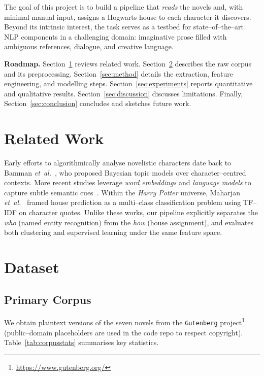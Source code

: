 \documentclass[12pt]{article}
\begin{document}
The goal of this project is to build a pipeline that \emph{reads} the novels and, with minimal manual input, assigns a Hogwarts house to each character it discovers. 
Beyond its intrinsic interest, the task serves as a testbed for state--of--the--art NLP components in a challenging domain: imaginative prose filled with ambiguous references, dialogue, and creative language.

\medskip
\textbf{Roadmap.} Section~\ref{sec:lit} reviews related work. Section~\ref{sec:data} describes the raw corpus and its preprocessing. Section~\ref{sec:method} details the extraction, feature engineering, and modelling steps. Section~\ref{sec:experiments} reports quantitative and qualitative results. Section~\ref{sec:discussion} discusses limitations. Finally, Section~\ref{sec:conclusion} concludes and sketches future work.

\section{Related Work}
\label{sec:lit}
Early efforts to algorithmically analyse novelistic characters date back to Bamman \textit{et~al.}~\cite{bamman2014bayesian}, who proposed Bayesian topic models over character--centred contexts. 
More recent studies leverage \emph{word embeddings} and \emph{language models} to capture subtle semantic cues~\cite{hegde2020dykg}. 
Within the \textit{Harry Potter} universe, Maharjan \textit{et~al.}~\cite{maharjan2018house} framed house prediction as a multi--class classification problem using TF--IDF on character quotes. 
Unlike these works, our pipeline explicitly separates the \emph{who} (named entity recognition) from the \emph{how} (house assignment), and evaluates both clustering and supervised learning under the same feature space.

\section{Dataset}
\label{sec:data}
\subsection{Primary Corpus}
We obtain plaintext versions of the seven novels from the \texttt{Gutenberg} project\footnote{\url{https://www.gutenberg.org/}} (public--domain placeholders are used in the code repo to respect copyright). 
Table~\ref{tab:corpusstats} summarises key statistics.
\end{document}
